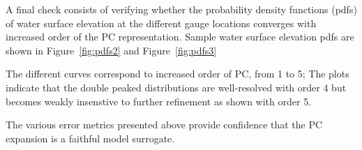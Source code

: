  
A final check consists of verifying whether the probability density
functions (pdfs) of water surface elevation at the different gauge locations
converges with increased order of the PC representation.  Sample
water surface elevation pdfs are shown in Figure~\ref{fig:pdfs2}
and Figure~\ref{fig:pdfs3}

The different curves
correspond to increased order of PC, from 1 to 5; 
The plots indicate that the double peaked distributions are
well-resolved with order  4 but becomes weakly insenstive to further refinement 
as shown with order 5.

The various error metrics presented above 
provide confidence that the PC expansion is a faithful 
model surrogate. 

\clearpage

